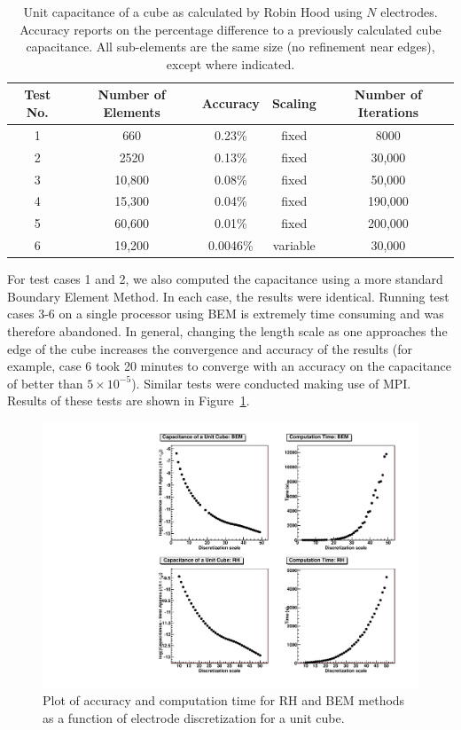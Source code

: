 \begin{table}[htdp]
\caption{Unit capacitance of a cube as calculated by Robin Hood using $N$ electrodes.  Accuracy reports on the percentage difference to a previously calculated cube capacitance.  All sub-elements are the same size (no refinement near edges), except where indicated.}
\begin{center}
\begin{tabular}{|c|c|c|c|c|}
\hline
Test No. & Number of Elements & Accuracy & Scaling & Number of Iterations \\
\hline
1 & 660 & 0.23\% & fixed & 8000 \\ 
2 & 2520 & 0.13\% & fixed & 30,000 \\
3 & 10,800 & 0.08\% & fixed & 50,000 \\
4 & 15,300 & 0.04\% & fixed & 190,000 \\
5 & 60,600 & 0.01\% & fixed & 200,000 \\
6 & 19,200 & 0.0046\% & variable & 30,000 \\
\hline
\end{tabular}
\end{center}
\label{tab:cube}
\end{table}%

For test cases 1 and 2, we also computed the capacitance using a more standard Boundary Element Method.  In each case, the results were identical.  Running test cases 3-6 on a single processor using BEM is extremely time consuming and was therefore abandoned.  In general, changing the length scale as one approaches the edge of the cube increases the convergence and accuracy of the results (for example, case 6 took 20 minutes to converge with an accuracy on the capacitance of better than $5\times10^{-5}$). Similar tests were conducted making use of MPI.  Results of these tests are shown in Figure~\ref{fig:cube_results}.

\begin{figure}[htbp]
\begin{center}
\includegraphics[width=\textwidth]{images/KEMFieldPlots/RH_vs_BEM.pdf}
\caption{Plot of accuracy and computation time for RH and BEM methods as a function of electrode discretization for a unit cube.}
\label{fig:cube_results}
\end{center}
\end{figure}

